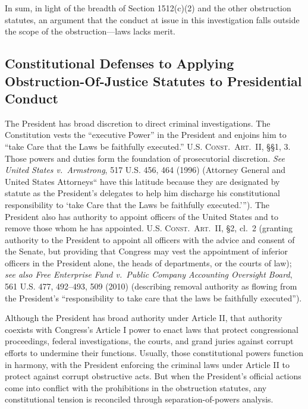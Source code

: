 \hr

In sum, in light of the breadth of Section 1512(c)(2) and the other obstruction statutes, an argument that the conduct at issue in this investigation falls outside the scope of the obstruction---laws lacks merit.

\subsection{Constitutional Defenses to Applying Obstruction-Of-Justice Statutes to Presidential Conduct}

The President has broad discretion to direct criminal investigations.
The Constitution vests the “executive Power” in the President and enjoins him to “take Care that the Laws be faithfully executed.” \textsc{U.S. Const.\ Art.~II}, \S\S 1, 3.
Those powers and duties form the foundation of prosecutorial discretion.
\textit{See United States v.\ Armstrong}, 517 U.S. 456, 464 (1996) (Attorney General and United States Attorneys“ have this latitude because they are designated by statute as the President’s delegates to help him discharge his constitutional responsibility to ‘take Care that the Laws be faithfully executed.’”).
The President also has authority to appoint officers of the United States and to remove those whom he has appointed.
\textsc{U.S. Const.\ Art.~II}, \S 2, cl.~2 (granting authority to the President to appoint all officers with the advice and consent of the Senate, but providing that Congress may vest the appointment of inferior officers in the President alone, the heads of departments, or the courts of law);
\textit{see also Free Enterprise Fund v.\ Public Company Accounting Oversight Board}, 561 U.S. 477, 492--493, 509 (2010) (describing removal authority as flowing from the President’s “responsibility to take care that the laws be faithfully executed”).

Although the President has broad authority under Article II, that authority coexists with Congress’s Article I power to enact laws that protect congressional proceedings, federal investigations, the courts, and grand juries against corrupt efforts to undermine their functions.
Usually, those constitutional powers function in harmony, with the President enforcing the criminal laws under Article II to protect against corrupt obstructive acts.
But when the President’s official actions come into conflict with the prohibitions in the obstruction statutes, any constitutional tension is reconciled through separation-of-powers analysis.

